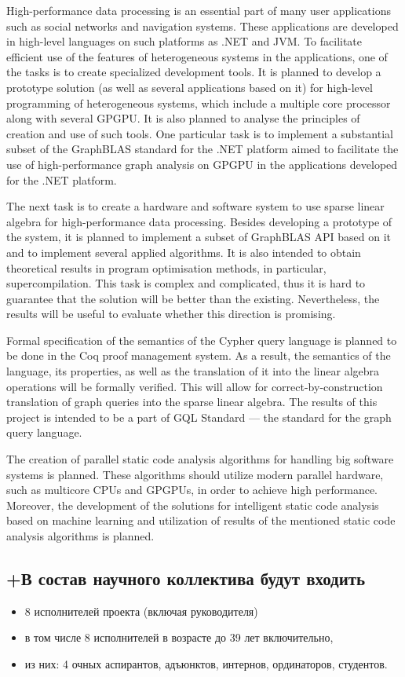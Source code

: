 \documentclass[12pt]{article}  %
\theoremstyle{remark}
\begin{document}
High-performance data processing is an essential part of many user applications such as social networks and navigation systems. These applications are developed in high-level languages on such platforms as .NET and JVM. To facilitate efficient use of the features of heterogeneous systems in the applications, one of the tasks is to create specialized development tools. It is planned to develop a prototype solution (as well as several applications based on it) for high-level programming of heterogeneous systems, which include a multiple core processor along with several GPGPU. It is also planned to analyse the principles of creation and use of such tools. One particular task is to implement a substantial subset of the GraphBLAS standard for the .NET platform aimed to facilitate the use of high-performance graph analysis on GPGPU in the applications developed for the .NET platform.   

The next task is to create a hardware and software system to use sparse linear algebra for high-performance data processing. Besides developing a prototype of the system, it is planned to implement a subset of GraphBLAS API based on it and to implement several applied algorithms. It is also intended to obtain theoretical results in program optimisation methods, in particular, supercompilation. This task is complex and complicated, thus it is hard to guarantee that the solution will be better than the existing. Nevertheless, the results will be useful to evaluate whether this direction is promising.  

Formal specification of the semantics of the Cypher query language is planned to be done in the Coq proof management system. As a result, the semantics of the language, its properties, as well as the translation of it into the linear algebra operations will be formally verified. This will allow for correct-by-construction translation of graph queries into the sparse linear algebra. The results of this project is intended to be a part of GQL Standard --- the standard for the graph query language. 

The creation of parallel static code analysis algorithms for handling big software systems is planned. These algorithms should utilize modern parallel hardware, such as multicore CPUs and GPGPUs, in order to achieve high performance. Moreover, the development of the solutions for intelligent static code analysis based on machine learning and utilization of results of the mentioned static code analysis algorithms is planned.

\subsection{+В состав научного коллектива будут входить}
%
\begin{itemize}
\item 8 исполнителей проекта (включая руководителя)
\item в том числе 8  исполнителей в возрасте до 39 лет включительно,
\item из них: 4 очных аспирантов, адъюнктов, интернов, ординаторов, студентов.
\end{itemize}
\end{document}
